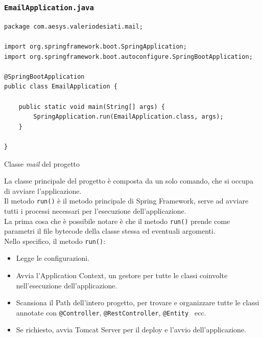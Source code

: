 \subsubsection{\texttt{EmailApplication.java}}
\begin{algorithm}
\centering
\begin{verbatim}
package com.aesys.valeriodesiati.mail;

import org.springframework.boot.SpringApplication;
import org.springframework.boot.autoconfigure.SpringBootApplication;

@SpringBootApplication
public class EmailApplication {
    
    public static void main(String[] args) {
        SpringApplication.run(EmailApplication.class, args);
    }

}
\end{verbatim}
\caption{Classe \emph{mail} del progetto}\label{alg:emailapplication}
\end{algorithm}

La classe principale del progetto è composta da un solo comando, che si occupa di avviare l'applicazione.\\
Il metodo \texttt{run()} è il metodo principale di Spring Framework, serve ad avviare tutti i processi necessari per l'esecuzione dell'applicazione.\\
La prima cosa che è possibile notare è che il metodo \texttt{run()} prende come parametri il file bytecode della classe stessa ed eventuali argomenti.\\
Nello specifico, il metodo \texttt{run()}:
\begin{itemize}
\item Legge le configurazioni.
\item Avvia l'Application Context, un gestore per tutte le classi coinvolte nell'esecuzione dell'applicazione.
\item Scansiona il Path dell'intero progetto, per trovare e organizzare tutte le classi annotate con \texttt{@Controller}, \texttt{@RestController}, \texttt{@Entity } ecc.
\item Se richiesto, avvia Tomcat Server per il deploy e l'avvio dell'applicazione.
\end{itemize}
\newpage
